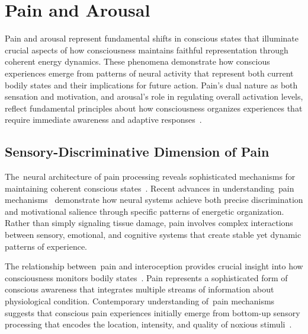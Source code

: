 \section{Pain and Arousal}

Pain and arousal represent fundamental shifts in conscious states that illuminate crucial aspects of how consciousness maintains faithful representation through coherent energy dynamics. These phenomena demonstrate how conscious experiences emerge from patterns of neural activity that represent both current bodily states and their implications for future action. Pain's dual nature as both sensation and motivation, and arousal's role in regulating overall activation levels, reflect fundamental principles about how consciousness organizes experiences that require immediate awareness and adaptive responses~\cite{Damasio2013, kukushkin2024massed}.

\subsection*{Sensory-Discriminative Dimension of Pain}

The~neural architecture of pain processing reveals sophisticated mechanisms for maintaining coherent conscious states~\cite{Tracey2007, hunt2024electromagnetic}. Recent advances in understanding~pain mechanisms~\cite{Apkarian2005, pinotsis2023cytoelectric} demonstrate how neural systems achieve both precise discrimination and motivational salience through specific patterns of energetic organization. Rather than simply signaling tissue damage, pain involves complex interactions between sensory, emotional, and cognitive systems that create stable yet dynamic patterns of experience.

The relationship between~pain and interoception provides crucial insight into how consciousness monitors bodily states~\cite{Craig2003, van2025processes}. Pain represents a sophisticated form of conscious awareness that integrates multiple streams of information about physiological condition. Contemporary understanding of~pain mechanisms suggests that conscious pain experiences initially emerge from bottom-up sensory processing that encodes the location, intensity, and quality of noxious stimuli~\cite{Garland2012, bosl2025dynamical}.

